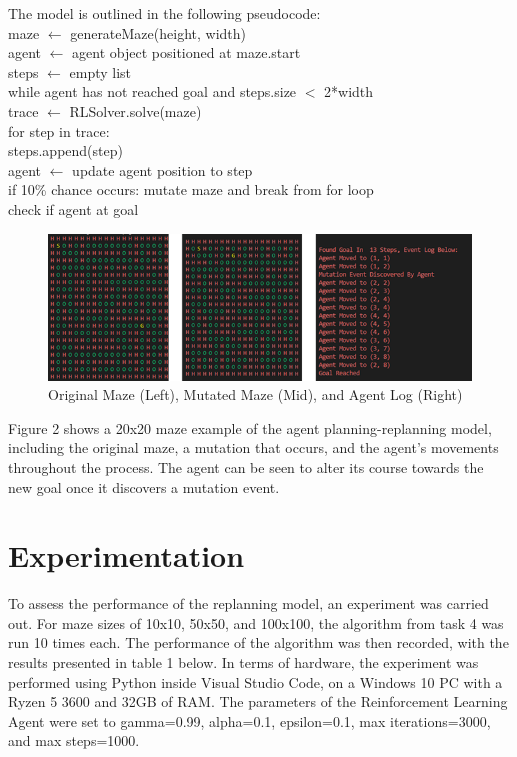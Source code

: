 \documentclass{article}
\begin{document}
The model is outlined in the following pseudocode:\\
\hspace*{2cm}maze $\leftarrow$ generateMaze(height, width)\\
\hspace*{2cm}agent $\leftarrow$ agent object positioned at maze.start\\
\hspace*{2cm}steps $\leftarrow$ empty list\\
\hspace*{2cm}while agent has not reached goal and steps.size $<$ 2*width\\
\hspace*{3cm}trace $\leftarrow$ RLSolver.solve(maze)\\
\hspace*{3cm}for step in trace:\\
	\hspace*{4cm}steps.append(step)\\
	\hspace*{4cm}agent $\leftarrow$ update agent position to step\\
	\hspace*{4cm}if 10\% chance occurs: mutate maze and break from for loop\\
\hspace*{2cm}check if agent at goal

\begin{figure}[ht]
	\centering
	\includegraphics[width=\textwidth]{assets/task4figure.png}
	\caption{Original Maze (Left), Mutated Maze (Mid), and Agent Log (Right)}
\end{figure}

Figure 2 shows a 20x20 maze example of the agent planning-replanning model, including the original maze, a mutation that occurs, and the agent's movements throughout the process. The agent can be seen to alter its course towards the new goal once it discovers a mutation event.


\section{Experimentation }\label{sec:experimentation} 
To assess the performance of the replanning model, an experiment was carried out. For maze sizes of 10x10, 50x50, and 100x100, the algorithm from task 4 was run 10 times each. The performance of the algorithm was then recorded, with the results presented in table 1 below. In terms of hardware, the experiment was performed using Python inside Visual Studio Code, on a Windows 10 PC with a Ryzen 5 3600 and 32GB of RAM. The parameters of the Reinforcement Learning Agent were set to gamma=0.99, alpha=0.1, epsilon=0.1, max iterations=3000, and max steps=1000.
\end{document}
